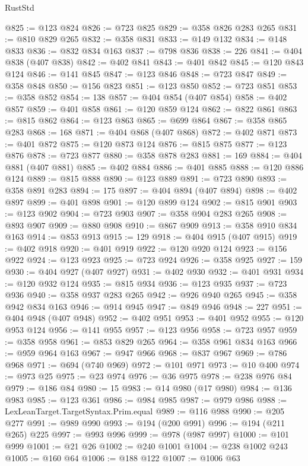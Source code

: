 \begin{lexlean}{RustStd}
\begin{coremodule}
@825 := @123 @824
@826 := @723 @825
@829 := @358 @826 @283 @265
@831 := @810 @829 @265
@832 := @358 @831
@833 := @149 @132
@834 := @148 @833
@836 := @832 @834 @163
@837 := @798 @836
@838 := 226
@841 := @404 @838 (@407 @838)
@842 := @402 @841
@843 := @401 @842
@845 := @120 @843 @124
@846 := @141 @845
@847 := @123 @846
@848 := @723 @847
@849 := @358 @848
@850 := @156 @823
@851 := @123 @850
@852 := @723 @851
@853 := @358 @852
@854 := 138
@857 := @404 @854 (@407 @854)
@858 := @402 @857
@859 := @401 @858
@861 := @120 @859 @124
@862 := @822 @861
@863 := @815 @862
@864 := @123 @863
@865 := @699 @864
@867 := @358 @865 @283
@868 := 168
@871 := @404 @868 (@407 @868)
@872 := @402 @871
@873 := @401 @872
@875 := @120 @873 @124
@876 := @815 @875
@877 := @123 @876
@878 := @723 @877
@880 := @358 @878 @283
@881 := 169
@884 := @404 @881 (@407 @881)
@885 := @402 @884
@886 := @401 @885
@888 := @120 @886 @124
@889 := @815 @888
@890 := @123 @889
@891 := @723 @890
@893 := @358 @891 @283
@894 := 175
@897 := @404 @894 (@407 @894)
@898 := @402 @897
@899 := @401 @898
@901 := @120 @899 @124
@902 := @815 @901
@903 := @123 @902
@904 := @723 @903
@907 := @358 @904 @283 @265
@908 := @893 @907
@909 := @880 @908
@910 := @867 @909
@913 := @358 @910 @834 @163
@914 := @853 @913
@915 := 129
@918 := @404 @915 (@407 @915)
@919 := @402 @918
@920 := @401 @919
@922 := @120 @920 @124
@923 := @156 @922
@924 := @123 @923
@925 := @723 @924
@926 := @358 @925
@927 := 159
@930 := @404 @927 (@407 @927)
@931 := @402 @930
@932 := @401 @931
@934 := @120 @932 @124
@935 := @815 @934
@936 := @123 @935
@937 := @723 @936
@940 := @358 @937 @283 @265
@942 := @926 @940 @265
@945 := @358 @942 @834 @163
@946 := @914 @945
@947 := @849 @946
@948 := 227
@951 := @404 @948 (@407 @948)
@952 := @402 @951
@953 := @401 @952
@955 := @120 @953 @124
@956 := @141 @955
@957 := @123 @956
@958 := @723 @957
@959 := @358 @958
@961 := @853 @829 @265
@964 := @358 @961 @834 @163
@966 := @959 @964 @163
@967 := @947 @966
@968 := @837 @967
@969 := @786 @968
@971 := @694 (@740 @969)
@972 := @101 @971
@973 := @10 @400
@974 := @973 @25
@975 := @23 @974
@976 := @36 @975
@978 := @238 @976 @84
@979 := @186 @84
@980 := 15
@983 := @14 @980 (@17 @980)
@984 := @136 @983
@985 := @123 @361
@986 := @984 @985
@987 := @979 @986
@988 := LexLeanTarget.TargetSyntax.Prim.equal
@989 := @116 @988
@990 := @205 @277
@991 := @989 @990
@993 := @194 (@200 @991)
@996 := @194 (@211 @265) @225
@997 := @993 @996
@999 := @978 (@987 @997)
@1000 := @101 @999
@1001 := @21 @26
@1002 := @240 @1001
@1004 := @238 @1002 @243
@1005 := @160 @64
@1006 := @188 @122
@1007 := @1006 @63

\end{coremodule}
\end{lexlean}
